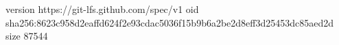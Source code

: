 version https://git-lfs.github.com/spec/v1
oid sha256:8623c958d2eaffd624f2e93cdac5036f15b9b6a2be2d8eff3d25453dc85aed2d
size 87544
